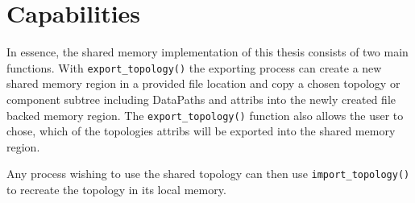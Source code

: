 \section{Capabilities}
In essence, the shared memory implementation of this thesis consists of two main functions.
With \lstinline|export_topology()| the exporting process can create a new shared memory region in a provided file location and
copy a chosen topology or component subtree including DataPaths and attribs into the newly created file backed memory region.
The \lstinline|export_topology()| function also allows the user to chose, which of the topologies attribs will be exported into the shared memory region.

Any process wishing to use the shared topology can then use \lstinline|import_topology()| to recreate the topology in its local memory.
